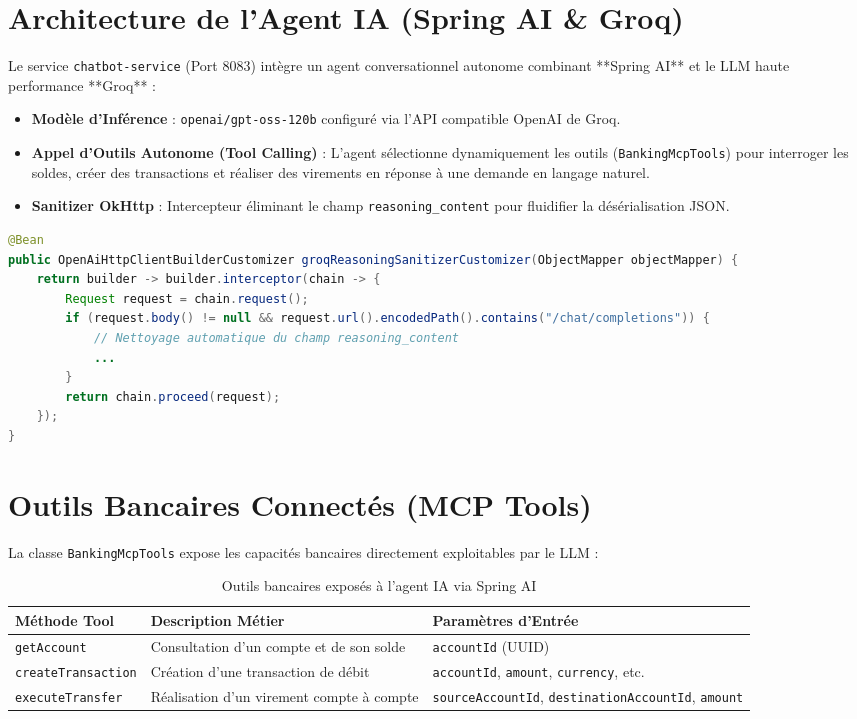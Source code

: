 \documentclass[11pt,a4paper]{report}
\begin{document}
\section{Architecture de l'Agent IA (Spring AI \& Groq)}
Le service \texttt{chatbot-service} (Port 8083) intègre un agent conversationnel autonome combinant **Spring AI** et le LLM haute performance **Groq** :
\begin{itemize}
    \item \textbf{Modèle d'Inférence} : \texttt{openai/gpt-oss-120b} configuré via l'API compatible OpenAI de Groq.
    \item \textbf{Appel d'Outils Autonome (Tool Calling)} : L'agent sélectionne dynamiquement les outils (\texttt{BankingMcpTools}) pour interroger les soldes, créer des transactions et réaliser des virements en réponse à une demande en langage naturel.
    \item \textbf{Sanitizer OkHttp} : Intercepteur éliminant le champ \texttt{reasoning\_content} pour fluidifier la désérialisation JSON.
\end{itemize}

\begin{lstlisting}[language=Java, caption=Customizer de nettoyage du payload Groq reasoning\_content]
@Bean 
public OpenAiHttpClientBuilderCustomizer groqReasoningSanitizerCustomizer(ObjectMapper objectMapper) {
    return builder -> builder.interceptor(chain -> {
        Request request = chain.request();
        if (request.body() != null && request.url().encodedPath().contains("/chat/completions")) {
            // Nettoyage automatique du champ reasoning_content
            ...
        }
        return chain.proceed(request);
    });
}
\end{lstlisting}

\section{Outils Bancaires Connectés (MCP Tools)}
La classe \texttt{BankingMcpTools} expose les capacités bancaires directement exploitables par le LLM :
\begin{table}[htbp]
\centering
\begin{tabularx}{\textwidth}{l p{5.5cm} X}
\toprule
\textbf{Méthode Tool} & \textbf{Description Métier} & \textbf{Paramètres d'Entrée} \\
\midrule
\texttt{getAccount} & Consultation d'un compte et de son solde & \texttt{accountId} (UUID) \\
\texttt{createTransaction} & Création d'une transaction de débit & \texttt{accountId}, \texttt{amount}, \texttt{currency}, etc. \\
\texttt{executeTransfer} & Réalisation d'un virement compte à compte & \texttt{sourceAccountId}, \texttt{destinationAccountId}, \texttt{amount} \\
\bottomrule
\end{tabularx}
\caption{Outils bancaires exposés à l'agent IA via Spring AI}
\end{table}
\end{document}
